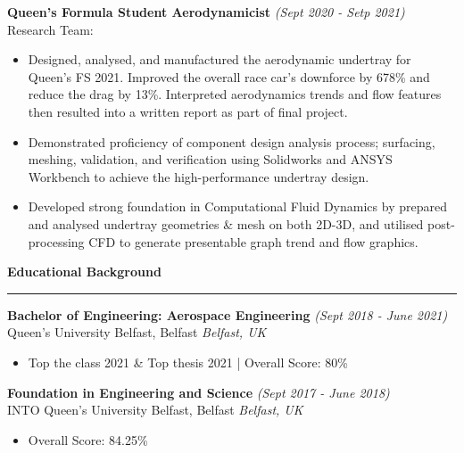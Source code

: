 \documentclass[11pt]{resume} %
\begin{document}
\textbf{Queen's Formula Student Aerodynamicist} \hfill \textit{(Sept 2020 - Setp 2021)}\\
Research Team:\\
\begin{itemize}
    \vspace{-5mm}
    \item{
        Designed, analysed, and manufactured the aerodynamic undertray for Queen’s FS 2021. 
        Improved the overall race car’s downforce by 678\% and reduce the drag by 13\%. 
        Interpreted aerodynamics trends and flow features then resulted 
        into a written report as part of final project.
        }
    \item{
        Demonstrated proficiency of component design analysis process; 
        surfacing, meshing, validation, and verification using Solidworks and 
        ANSYS Workbench to achieve the high-performance undertray design.
        }
    \item{
        Developed strong foundation in Computational Fluid Dynamics by prepared and 
        analysed undertray geometries \& mesh on both 2D-3D, and utilised post-processing 
        CFD to generate presentable graph trend and flow graphics.
        }
\end{itemize}


{\large \bf Educational Background} \sectionlineskip \hrule %

\textbf{Bachelor of Engineering: Aerospace Engineering} \hfill \textit{(Sept 2018 - June 2021)}\\
Queen's University Belfast, Belfast \hfill \textit{Belfast, UK}\\ 
\vspace{-6mm}
\begin{itemize}
    \item{Top the class 2021 \& Top thesis 2021 | Overall Score: 80}\%
\end{itemize}


\textbf{Foundation in Engineering and Science} \hfill \textit{(Sept 2017 - June 2018)}\\
INTO Queen's University Belfast, Belfast \hfill \textit{Belfast, UK} \\ 
\vspace{-6mm}
\begin{itemize}
    \item{Overall Score: 84.25\%}
\end{itemize}
\end{document}
